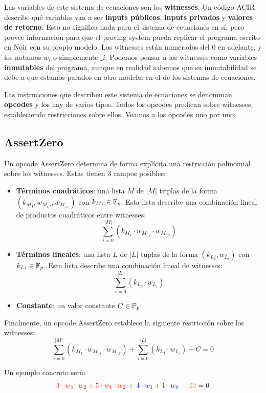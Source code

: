 Las variables de este sistema de ecuaciones son los \textbf{witnesses}. Un código ACIR describe qué variables van a ser \textbf{inputs públicos}, \textbf{inputs privados} y \textbf{valores de retorno}. Esto no significa nada para el sistema de ecuaciones en sí, pero provee información para que el proving system pueda replicar el programa escrito en Noir con su propio modelo. Los witnesses están numerados del $0$ en adelante, y los notamos $w_i$ o simplemente $\_i$. Podemos pensar a los witnesses como variables \textbf{inmutables} del programa, aunque en realidad sabemos que su inmutabilidad se debe a que estamos parados en otro modelo: en el de los sistemas de ecuaciones. 

Las instrucciones que describen este sistema de ecuaciones se denominan \textbf{opcodes} y los hay de varios tipos. Todos los opcodes predican sobre witnesses, estableciendo restricciones sobre ellos. Veamos a los opcodes uno por uno:

\subsection{AssertZero}

Un opcode AssertZero determina de forma explícita una restricción polinomial sobre los witnesses. Estas tienen 3 campos posibles:
\begin{itemize}
    \item \textbf{Términos cuadráticos}: una lista $M$ de $|M|$ triplas de la forma $({k_M}_i,w_{M_{i,l}}, w_{M_{i,r}})$ con ${k_M}_i\in \mathbb{F}_p$. Esta lista describe una combinación lineal de productos cuadráticos entre witnesses: 
    $$\sum_{i=0}^{|M|}({k_M}_i\cdot w_{M_{i,l}} \cdot w_{M_{i,r}})$$
    
    \item \textbf{Términos lineales}: una lista $L$ de $|L|$ tuplas de la forma $({k_L}_i,w_{L_i})$ con ${k_L}_i\in \mathbb{F}_p$. Esta lista describe una combinación lineal de witnesses:
    $$\sum_{i=0}^{|L|}({k_L}_i\cdot w_{L_i} )$$
    
    \item \textbf{Constante}: un valor constante $C \in \mathbb{F}_p$.
\end{itemize}
Finalmente, un opcode AssertZero establece la siguiente restricción sobre los witnesses:
$$\sum_{i=0}^{|M|}({k_M}_i\cdot w_{M_{i,l}} \cdot w_{M_{i,r}}) + \sum_{i=0}^{|L|}({k_L}_i\cdot w_{L_i} ) + C = 0$$

Un ejemplo concreto sería
$$\textcolor{red}{3\cdot w_3\cdot w_2 + 5 \cdot w_1 \cdot w_2} \textcolor{blue}{~+~ 4\cdot w_1 + 1 \cdot w_0} \textcolor{orange}{ ~+~ 22} = 0$$

